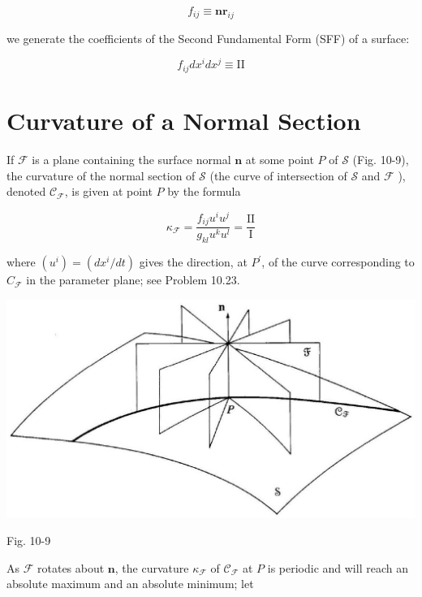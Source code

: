 \documentclass[10pt]{article}
\begin{document}
\begin{equation*}
f_{i j} \equiv \mathbf{n} \mathbf{r}_{i j} \tag{10.21}
\end{equation*}


we generate the coefficients of the Second Fundamental Form (SFF) of a surface:


\begin{equation*}
f_{i j} d x^{i} d x^{j} \equiv \mathrm{II} \tag{10.22}
\end{equation*}


\section*{Curvature of a Normal Section}
If $\mathscr{F}$ is a plane containing the surface normal $\mathbf{n}$ at some point $P$ of $\mathscr{S}$ (Fig. 10-9), the curvature of the normal section of $\mathscr{S}$ (the curve of intersection of $\mathscr{S}$ and $\mathscr{F}$ ), denoted $\mathscr{C}_{\mathscr{F}}$, is given at point $P$ by the formula


\begin{equation*}
\kappa_{\mathscr{F}}=\frac{f_{i j} u^{i} u^{j}}{g_{k l} u^{k} u^{l}}=\frac{\mathrm{II}}{\mathrm{I}} \tag{10.23}
\end{equation*}


where $\left(u^{i}\right)=\left(d x^{i} / d t\right)$ gives the direction, at $P^{\prime}$, of the curve corresponding to $C_{\mathscr{F}}$ in the parameter plane; see Problem 10.23.

\begin{center}
\includegraphics[max width=\textwidth]{2024_04_03_41f90be4f896e21f0dc9g-145}
\end{center}

Fig. 10-9

As $\mathscr{F}$ rotates about $\mathbf{n}$, the curvature $\kappa_{\mathscr{F}}$ of $\mathscr{C}_{\mathscr{F}}$ at $P$ is periodic and will reach an absolute maximum and an absolute minimum; let
\end{document}
